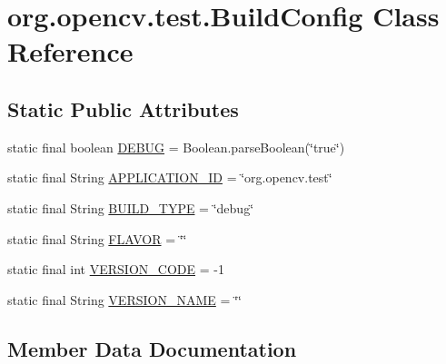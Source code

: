 \hypertarget{classorg_1_1opencv_1_1test_1_1_build_config}{}\section{org.\+opencv.\+test.\+Build\+Config Class Reference}
\label{classorg_1_1opencv_1_1test_1_1_build_config}
\subsection*{Static Public Attributes}
\begin{DoxyCompactItemize}
\item 
static final boolean \mbox{\hyperlink{classorg_1_1opencv_1_1test_1_1_build_config_a609a48267108d798cff8b1b4b08935fc}{D\+E\+B\+UG}} = Boolean.\+parse\+Boolean(\char`\"{}true\char`\"{})
\item 
static final String \mbox{\hyperlink{classorg_1_1opencv_1_1test_1_1_build_config_aba20e00b00fcdc1fa7db7acfeb8f2e05}{A\+P\+P\+L\+I\+C\+A\+T\+I\+O\+N\+\_\+\+ID}} = \char`\"{}org.\+opencv.\+test\char`\"{}
\item 
static final String \mbox{\hyperlink{classorg_1_1opencv_1_1test_1_1_build_config_a7f983654ca1e2680294f2e09b1b82205}{B\+U\+I\+L\+D\+\_\+\+T\+Y\+PE}} = \char`\"{}debug\char`\"{}
\item 
static final String \mbox{\hyperlink{classorg_1_1opencv_1_1test_1_1_build_config_ac72a94697ff21c090ef2cee353821598}{F\+L\+A\+V\+OR}} = \char`\"{}\char`\"{}
\item 
static final int \mbox{\hyperlink{classorg_1_1opencv_1_1test_1_1_build_config_a8f5ff25a3b56a2765f930ee32d5e786a}{V\+E\+R\+S\+I\+O\+N\+\_\+\+C\+O\+DE}} = -\/1
\item 
static final String \mbox{\hyperlink{classorg_1_1opencv_1_1test_1_1_build_config_a29291ba94772b8bd4595cb053f4f19b9}{V\+E\+R\+S\+I\+O\+N\+\_\+\+N\+A\+ME}} = \char`\"{}\char`\"{}
\end{DoxyCompactItemize}


\subsection{Member Data Documentation}
\mbox{\label{classorg_1_1opencv_1_1test_1_1_build_config_aba20e00b00fcdc1fa7db7acfeb8f2e05}} 
